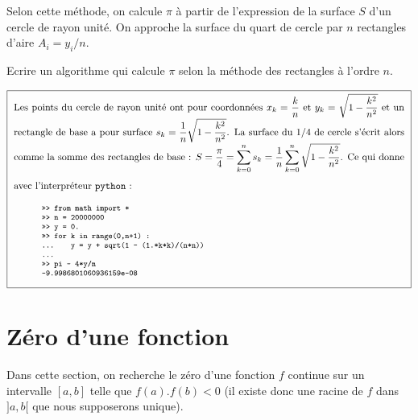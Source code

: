 \documentclass[12pt]{article}
\newenvironment{py}[1]{\begin{minipage}[t]{#1}\footnotesize}{\end{minipage}}
\begin{document}
Selon cette méthode, on calcule $\pi$ \`a partir de l'expression de la 
surface $S$ d'un cercle de rayon unité.
On approche la surface du quart de cercle par $n$ rectangles 
d'aire $A_i = y_i/n$.
	
	\begin{minipage}{9cm}
	Ecrire un algorithme qui calcule $\pi$ selon la méthode des rectangles
		à l'ordre $n$.
	\end{minipage}
	\hfill
	\begin{minipage}{4cm}
	\centerline{}
	\end{minipage}

$$\framebox[14.5cm]{\begin{minipage}{14cm}
Les points du cercle de rayon unité ont pour coordonnées
	$\displaystyle x_k = \frac{k}{n}$ et $\displaystyle y_k = \sqrt{1-\frac{k^2}{n^2}}$
	et un rectangle de base a pour surface $\displaystyle s_k = \frac{1}{n}\sqrt{1-\frac{k^2}{n^2}}$.
	La surface du 1/4 de cercle s'écrit alors comme la somme des rectangles de base :
	$\displaystyle S = \frac{\pi}{4} = \sum_{k=0}^n s_k = \frac{1}{n}\sum_{k=0}^n \sqrt{1-\frac{k^2}{n^2}}$.
\vspace*{3mm}

Ce qui donne avec l'interpréteur {\tt python} :
$$\begin{py}{12cm}
\tt
>>> from math import *\\
>>> n = 20000000\\
>>> y = 0.\\
>>> for k in range(0,n+1) :\\
...\ \ \ \ y = y + sqrt(1 - (1.*k*k)/(n*n))\\
... \\
>>> pi - 4*y/n\\
-9.9986801060936159e-08\\
\mbox{}
\end{py}$$
\end{minipage}}$$ 


\section{Zéro d'une fonction}
Dans cette section, on recherche le zéro d'une fonction $f$ continue sur un 
intervalle $[a,b]$ telle que $f(a).f(b) < 0$ 
(il existe donc une racine de $f$ dans $]a,b[$ que nous supposerons 
unique). 
\end{document}
